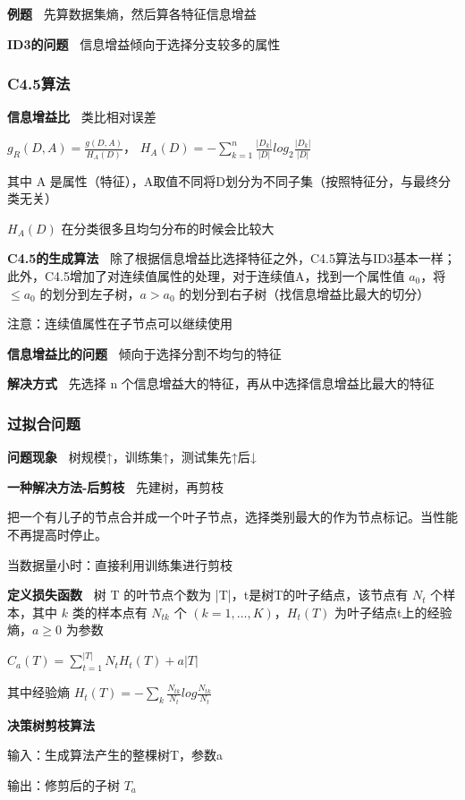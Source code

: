 \documentclass[b4paper, 10pt]{ctexart}
\begin{document}
\begin{multicols}{3}
\textbf{例题\ } 先算数据集熵，然后算各特征信息增益

\textbf{ID3的问题\ } 信息增益倾向于选择分支较多的属性

\subsubsection{C4.5算法}

\textbf{信息增益比\ } 类比相对误差

$
g_R(D,A) = \frac{g(D,A)}{H_A(D)}
$，
$
H_A(D) = -\sum_{k=1}^n \frac{
|D_k|}{|D|} log_2 \frac{|D_k|}{|D|}
$

其中 A 是属性（特征），A取值不同将D划分为不同子集（按照特征分，与最终分类无关）

$H_A(D)$ 在分类很多且均匀分布的时候会比较大

\textbf{C4.5的生成算法\ } 除了根据信息增益比选择特征之外，C4.5算法与ID3基本一样；此外，C4.5增加了对连续值属性的处理，对于连续值A，找到一个属性值 $a_0$，将 $\le a_0$ 的划分到左子树，$a>a_0$ 的划分到右子树（找信息增益比最大的切分）

注意：连续值属性在子节点可以继续使用

\textbf{信息增益比的问题\ } 倾向于选择分割不均匀的特征

\textbf{解决方式\ } 先选择 n 个信息增益大的特征，再从中选择信息增益比最大的特征

\subsubsection{过拟合问题}
\textbf{问题现象\ } 树规模↑，训练集↑，测试集先↑后↓

\textbf{一种解决方法-后剪枝\ } 先建树，再剪枝

把一个有儿子的节点合并成一个叶子节点，选择类别最大的作为节点标记。当性能不再提高时停止。

当数据量小时：直接利用训练集进行剪枝

\textbf{定义损失函数\ } 树 T 的叶节点个数为 |T|，t是树T的叶子结点，该节点有 $N_t$ 个样本，其中 $k$ 类的样本点有 $N_{tk}$ 个 $(k=1,\dots,K)$，$H_t(T)$ 为叶子结点t上的经验熵，$a\ge 0$ 为参数

$C_a(T) = \sum_{t=1}^{|T|}N_tH_t(T)+a|T|$

其中经验熵 $H_t(T)=-\sum_k \frac{N_{tk}}{N_t}log \frac{N_{tk}}{N_t}$

\textbf{决策树剪枝算法\ }

输入：生成算法产生的整棵树T，参数a

输出：修剪后的子树 $T_a$


\end{multicols}
\end{document}

